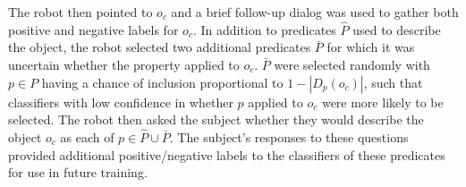 The robot then pointed to $o_c$ and a brief follow-up dialog was used to gather both positive and negative labels for $o_c$.
In addition to predicates $\hat{P}$ used to describe the object, the robot selected two additional predicates $\bar{P}$ for which it was uncertain whether the property applied to $o_c$.
$\bar{P}$ were selected randomly with $p\in P$ having a chance of inclusion proportional to $1-|D_p(o_c)|$, such that classifiers with low confidence in whether $p$ applied to $o_c$ were more likely to be selected.
The robot then asked the subject whether they would describe the object $o_c$ as each of $p\in\hat{P}\cup\bar{P}$.
The subject's responses to these questions provided additional positive/negative labels to the classifiers of these predicates for use in future training.